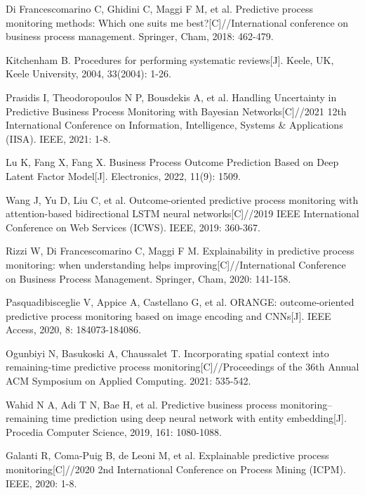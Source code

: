 \documentclass[runningheads]{llncs}
\begin{document}
		
	\newpage
	\begin{thebibliography}{99}
	
	Di Francescomarino C, Ghidini C, Maggi F M, et al. Predictive process monitoring methods: Which one suits me best?[C]//International conference on business process management. Springer, Cham, 2018: 462-479.
	
	Kitchenham B. Procedures for performing systematic reviews[J]. Keele, UK, Keele University, 2004, 33(2004): 1-26.
	
	Prasidis I, Theodoropoulos N P, Bousdekis A, et al. Handling Uncertainty in Predictive Business Process Monitoring with Bayesian Networks[C]//2021  12th International Conference on Information, Intelligence, Systems \& Applications (IISA). IEEE, 2021: 1-8.
	
	Lu K, Fang X, Fang X. Business Process Outcome Prediction Based on Deep Latent Factor Model[J]. Electronics, 2022, 11(9): 1509.
	
	Wang J, Yu D, Liu C, et al. Outcome-oriented predictive process monitoring with attention-based bidirectional LSTM neural networks[C]//2019 IEEE International Conference on Web Services (ICWS). IEEE, 2019: 360-367.
	
	Rizzi W, Di Francescomarino C, Maggi F M. Explainability in predictive process monitoring: when understanding helps improving[C]//International Conference on Business Process Management. Springer, Cham, 2020: 141-158.
	
	Pasquadibisceglie V, Appice A, Castellano G, et al. ORANGE: outcome-oriented predictive process monitoring based on image encoding and CNNs[J]. IEEE Access, 2020, 8: 184073-184086.
	
	Ogunbiyi N, Basukoski A, Chaussalet T. Incorporating spatial context into remaining-time predictive process monitoring[C]//Proceedings of the 36th Annual ACM Symposium on Applied Computing. 2021: 535-542.
	
	Wahid N A, Adi T N, Bae H, et al. Predictive business process monitoring–remaining time prediction using deep neural network with entity embedding[J]. Procedia Computer Science, 2019, 161: 1080-1088.
	
	Galanti R, Coma-Puig B, de Leoni M, et al. Explainable predictive process monitoring[C]//2020 2nd International Conference on Process Mining (ICPM). IEEE, 2020: 1-8.
	

\end{thebibliography}
\end{document}
